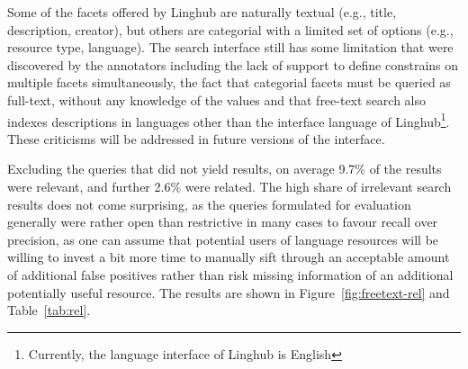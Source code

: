 \documentclass[smallextended]{svjour3}       %
\begin{document}
Some of the facets offered by Linghub are naturally textual (e.g., title,
description, creator), but others are categorial with a limited set of
options (e.g., resource type, language). The search interface still has some
limitation that were discovered by the annotators including the lack of support
to define constrains on multiple facets simultaneously, the fact
that categorial facets must be queried as full-text, without any knowledge of
the values and that free-text search also indexes descriptions in languages
other than the interface language of Linghub\footnote{Currently, the language interface of Linghub is English}. These criticisms will be addressed in future versions of the interface.




Excluding the queries that did not yield results, on average 9.7\% of the
results were relevant, and further 2.6\% were related. The high
share of irrelevant search results does not come surprising, as the queries
formulated for evaluation generally were rather open than restrictive in many
cases to favour recall over precision, as one can assume that potential users of
language resources will be willing to invest a bit more time to manually sift
through an acceptable amount of additional false positives rather than risk
missing information of an additional potentially useful resource. The results
are shown in Figure~\ref{fig:freetext-rel} and Table~\ref{tab:rel}.
\end{document}
